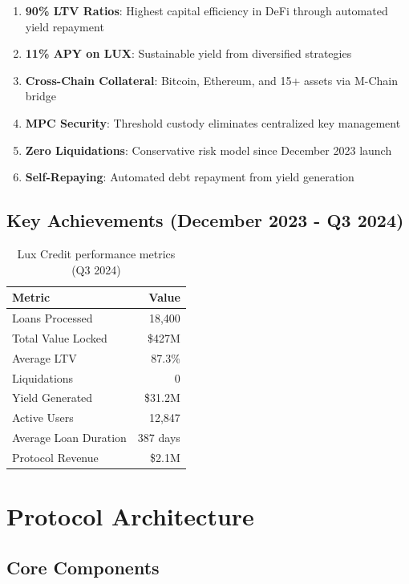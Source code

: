 \documentclass[11pt,a4paper]{article}
\begin{document}
\begin{enumerate}
\item \textbf{90\% LTV Ratios}: Highest capital efficiency in DeFi through automated yield repayment
\item \textbf{11\% APY on LUX}: Sustainable yield from diversified strategies
\item \textbf{Cross-Chain Collateral}: Bitcoin, Ethereum, and 15+ assets via M-Chain bridge
\item \textbf{MPC Security}: Threshold custody eliminates centralized key management
\item \textbf{Zero Liquidations}: Conservative risk model since December 2023 launch
\item \textbf{Self-Repaying}: Automated debt repayment from yield generation
\end{enumerate}

\subsection{Key Achievements (December 2023 - Q3 2024)}

\begin{table}[h]
\centering
\begin{tabular}{@{}lr@{}}
\toprule
\textbf{Metric} & \textbf{Value} \\ \midrule
Loans Processed & 18,400 \\
Total Value Locked & \$427M \\
Average LTV & 87.3\% \\
Liquidations & 0 \\
Yield Generated & \$31.2M \\
Active Users & 12,847 \\
Average Loan Duration & 387 days \\
Protocol Revenue & \$2.1M \\ \bottomrule
\end{tabular}
\caption{Lux Credit performance metrics (Q3 2024)}
\end{table}

\section{Protocol Architecture}

\subsection{Core Components}
\end{document}
